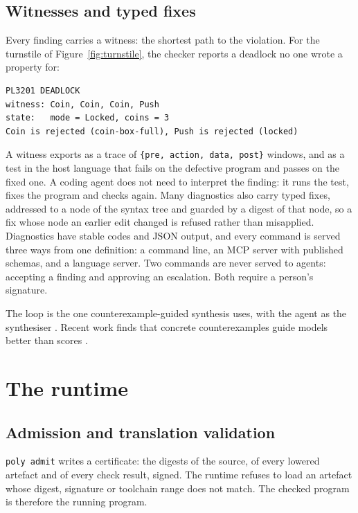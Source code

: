\documentclass[11pt]{article}
\begin{document}
\subsection{Witnesses and typed fixes}

Every finding carries a witness: the shortest path to the violation. For the turnstile of Figure~\ref{fig:turnstile}, the checker reports a deadlock no one wrote a property for:

\begin{lstlisting}[language={}]
PL3201 DEADLOCK
witness: Coin, Coin, Coin, Push
state:   mode = Locked, coins = 3
Coin is rejected (coin-box-full), Push is rejected (locked)
\end{lstlisting}

A witness exports as a trace of \texttt{\{pre, action, data, post\}} windows, and as a test in the host language that fails on the defective program and passes on the fixed one. A coding agent does not need to interpret the finding: it runs the test, fixes the program and checks again. Many diagnostics also carry typed fixes, addressed to a node of the syntax tree and guarded by a digest of that node, so a fix whose node an earlier edit changed is refused rather than misapplied. Diagnostics have stable codes and JSON output, and every command is served three ways from one definition: a command line, an MCP server with published schemas, and a language server. Two commands are never served to agents: accepting a finding and approving an escalation. Both require a person's signature.

The loop is the one counterexample-guided synthesis uses, with the agent as the synthesiser \cite{jha2023cegis,tihanyi2023esbmcai}. Recent work finds that concrete counterexamples guide models better than scores \cite{pereira2026property}.

\section{The runtime}
\label{sec:runtime}

\subsection{Admission and translation validation}

\texttt{poly admit} writes a certificate: the digests of the source, of every lowered artefact and of every check result, signed. The runtime refuses to load an artefact whose digest, signature or toolchain range does not match. The checked program is therefore the running program.
\end{document}
